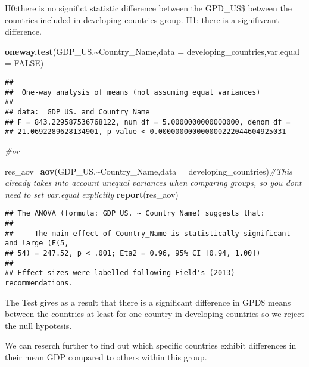 \documentclass[
]{article}
\newenvironment{Shaded}{\begin{snugshade}}{\end{snugshade}}
\newcommand{\AttributeTok}[1]{\textcolor[rgb]{0.13,0.29,0.53}{#1}}
\newcommand{\CommentTok}[1]{\textcolor[rgb]{0.56,0.35,0.01}{\textit{#1}}}
\newcommand{\ConstantTok}[1]{\textcolor[rgb]{0.56,0.35,0.01}{#1}}
\newcommand{\FunctionTok}[1]{\textcolor[rgb]{0.13,0.29,0.53}{\textbf{#1}}}
\newcommand{\NormalTok}[1]{#1}
\newcommand{\OtherTok}[1]{\textcolor[rgb]{0.56,0.35,0.01}{#1}}
\newcommand{\SpecialCharTok}[1]{\textcolor[rgb]{0.81,0.36,0.00}{\textbf{#1}}}
\begin{document}
H0:there is no significt statistic difference between the GPD\_US\$
between the countries included in developing countries group. H1: there
is a signifivcant difference.

\begin{Shaded}
\begin{Highlighting}[]
\FunctionTok{oneway.test}\NormalTok{(GDP\_US.}\SpecialCharTok{\textasciitilde{}}\NormalTok{Country\_Name,}\AttributeTok{data =}\NormalTok{ developing\_countries,}\AttributeTok{var.equal =} \ConstantTok{FALSE}\NormalTok{)}
\end{Highlighting}
\end{Shaded}

\begin{verbatim}
## 
##  One-way analysis of means (not assuming equal variances)
## 
## data:  GDP_US. and Country_Name
## F = 843.229587536768122, num df = 5.0000000000000000, denom df =
## 21.0692289628134901, p-value < 0.000000000000000222044604925031
\end{verbatim}

\begin{Shaded}
\begin{Highlighting}[]
\CommentTok{\#or}

\NormalTok{res\_aov}\OtherTok{=}\FunctionTok{aov}\NormalTok{(GDP\_US.}\SpecialCharTok{\textasciitilde{}}\NormalTok{Country\_Name,}\AttributeTok{data =}\NormalTok{ developing\_countries)}\CommentTok{\#This already takes into account unequal variances when comparing groups, so you don\textquotesingle{}t need to set var.equal explicitly}
\FunctionTok{report}\NormalTok{(res\_aov)}
\end{Highlighting}
\end{Shaded}

\begin{verbatim}
## The ANOVA (formula: GDP_US. ~ Country_Name) suggests that:
## 
##   - The main effect of Country_Name is statistically significant and large (F(5,
## 54) = 247.52, p < .001; Eta2 = 0.96, 95% CI [0.94, 1.00])
## 
## Effect sizes were labelled following Field's (2013) recommendations.
\end{verbatim}

The Test gives as a result that there is a significant difference in
GPD\$ means between the countries at least for one country in developing
countries so we reject the null hypotesis.

We can reserch further to find out which specific countries exhibit
differences in their mean GDP compared to others within this group.
\end{document}
